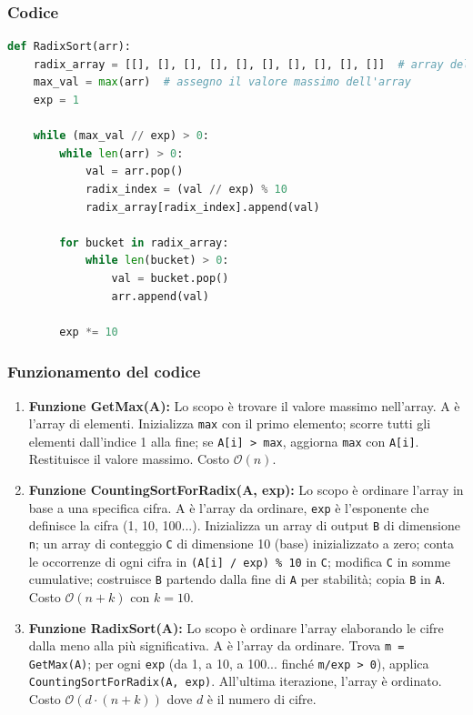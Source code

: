 \documentclass[a4paper, 11pt]{article}
\begin{document}
\subsubsection{Codice}
\begin{lstlisting}[style=mycodestyle, language=Python]
def RadixSort(arr):
    radix_array = [[], [], [], [], [], [], [], [], [], []]  # array delle cifre
    max_val = max(arr)  # assegno il valore massimo dell'array
    exp = 1 

    while (max_val // exp) > 0:
        while len(arr) > 0:
            val = arr.pop()
            radix_index = (val // exp) % 10
            radix_array[radix_index].append(val)

        for bucket in radix_array:
            while len(bucket) > 0:
                val = bucket.pop()
                arr.append(val)

        exp *= 10
\end{lstlisting}

\subsubsection*{Funzionamento del codice}
\begin{enumerate}

\item \textbf{Funzione GetMax(A):} Lo scopo è trovare il valore massimo nell'array. A è l'array di elementi. Inizializza \texttt{max} con il primo elemento; scorre tutti gli elementi dall'indice 1 alla fine; se \texttt{A[i] > max}, aggiorna \texttt{max} con \texttt{A[i]}. Restituisce il valore massimo. Costo $\mathcal{O}(n)$.

\item \textbf{Funzione CountingSortForRadix(A, exp):} Lo scopo è ordinare l'array in base a una specifica cifra. A è l'array da ordinare, \texttt{exp} è l'esponente che definisce la cifra (1, 10, 100...). Inizializza un array di output \texttt{B} di dimensione \texttt{n}; un array di conteggio \texttt{C} di dimensione 10 (base) inizializzato a zero; conta le occorrenze di ogni cifra in \texttt{(A[i] / exp) \% 10} in \texttt{C}; modifica \texttt{C} in somme cumulative; costruisce \texttt{B} partendo dalla fine di \texttt{A} per stabilità; copia \texttt{B} in \texttt{A}. Costo $\mathcal{O}(n + k)$ con $k=10$.

\item \textbf{Funzione RadixSort(A):} Lo scopo è ordinare l'array elaborando le cifre dalla meno alla più significativa. A è l'array da ordinare. Trova \texttt{m = GetMax(A)}; per ogni \texttt{exp} (da 1, a 10, a 100... finché \texttt{m/exp > 0}), applica \texttt{CountingSortForRadix(A, exp)}. All'ultima iterazione, l'array è ordinato. Costo $\mathcal{O}(d \cdot (n + k))$ dove $d$ è il numero di cifre.

\end{enumerate}
\end{document}
